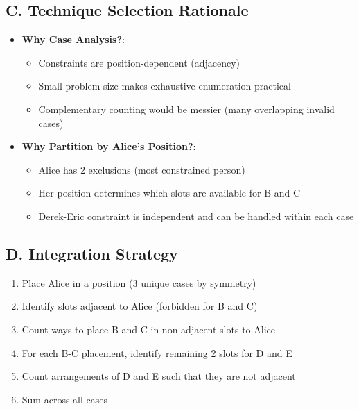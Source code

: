 \documentclass[]{article}
\begin{document}
\begin{techniquesbox}
\subsection*{C. Technique Selection Rationale}
\begin{itemize}[leftmargin=*]
    \item \textbf{Why Case Analysis?}: 
    \begin{itemize}
        \item Constraints are position-dependent (adjacency)
        \item Small problem size makes exhaustive enumeration practical
        \item Complementary counting would be messier (many overlapping invalid cases)
    \end{itemize}
    
    \item \textbf{Why Partition by Alice's Position?}:
    \begin{itemize}
        \item Alice has 2 exclusions (most constrained person)
        \item Her position determines which slots are available for B and C
        \item Derek-Eric constraint is independent and can be handled within each case
    \end{itemize}
\end{itemize}

\subsection*{D. Integration Strategy}
\begin{enumerate}[leftmargin=*]
    \item Place Alice in a position (3 unique cases by symmetry)
    \item Identify slots adjacent to Alice (forbidden for B and C)
    \item Count ways to place B and C in non-adjacent slots to Alice
    \item For each B-C placement, identify remaining 2 slots for D and E
    \item Count arrangements of D and E such that they are not adjacent
    \item Sum across all cases
\end{enumerate}
\end{techniquesbox}
\end{document}
